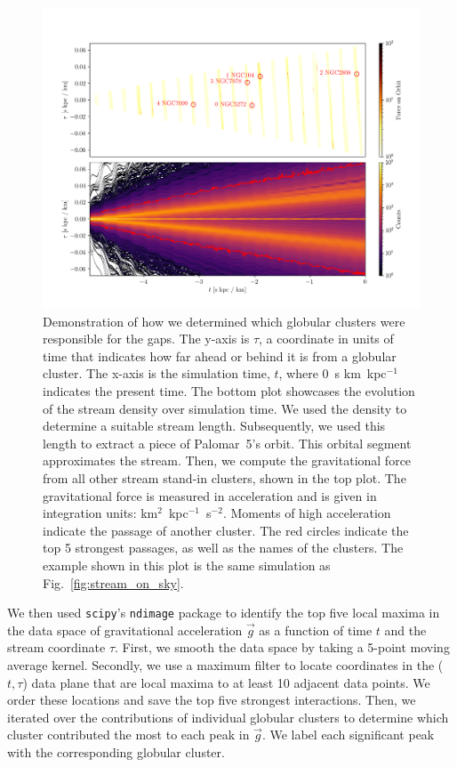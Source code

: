         \begin{figure}
            \centering
            \includegraphics[width=\linewidth]{images/force_on_orbit-monte-carlo-009.png}
            \caption[Demonstration of tagging perturbers from significant flybys]{Demonstration of how we determined which globular clusters were responsible for the gaps. The y-axis is $\tau$, a coordinate in units of time that indicates how far ahead or behind it is from a globular cluster. The x-axis is the simulation time, $t$, where 0~s km~kpc$^{-1}$ indicates the present time. The bottom plot showcases the evolution of the stream density over simulation time. We used the density to determine a suitable stream length. Subsequently, we used this length to extract a piece of Palomar~5's orbit. This orbital segment approximates the stream. Then, we compute the gravitational force from all other stream stand-in clusters, shown in the top plot. The gravitational force is measured in acceleration and is given in integration units: km$^2$~kpc$^{-1}$~s$^{-2}$. Moments of high acceleration indicate the passage of another cluster. The red circles indicate the top 5 strongest passages, as well as the names of the clusters. The example shown in this plot is the same simulation as Fig.~\ref{fig:stream_on_sky}.}
            \label{fig:force-on-orbit}
        \end{figure}          
        
        We then used \texttt{scipy}'s \texttt{ndimage} \citep{2020NatMe..17..261V} package to identify the top five local maxima in the data space of gravitational acceleration $\vec{g}$ as a function of time $t$ and the stream coordinate $\tau$. First, we smooth the data space by taking a 5-point moving average kernel. Secondly, we use a maximum filter to locate coordinates in the ($t,\tau$) data plane that are local maxima to at least 10 adjacent data points. We order these locations and save the top five strongest interactions. Then, we iterated over the contributions of individual globular clusters to determine which cluster contributed the most to each peak in $\vec{g}$. We label each significant peak with the corresponding globular cluster.

